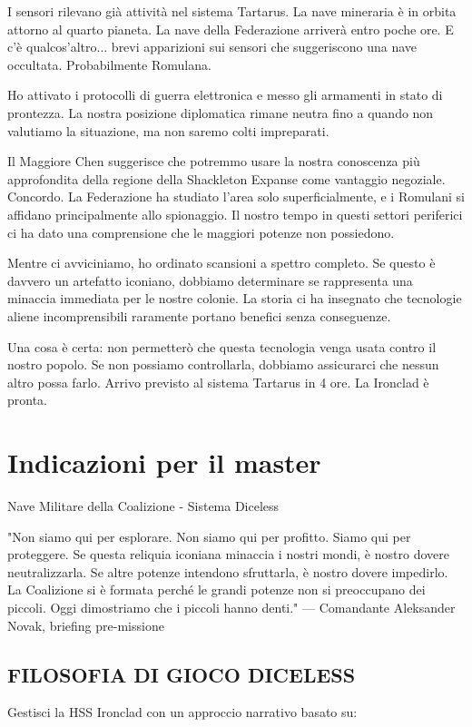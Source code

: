 \documentclass[letterpaper,twocolumn,openany,nodeprecatedcode]{dndbook}
\begin{document}
\begin{DndReadAloud}
I sensori rilevano già attività nel sistema Tartarus. La nave mineraria è in orbita attorno al quarto pianeta. La nave della Federazione arriverà entro poche ore. E c'è qualcos'altro... brevi apparizioni sui sensori che suggeriscono una nave occultata. Probabilmente Romulana.

Ho attivato i protocolli di guerra elettronica e messo gli armamenti in stato di prontezza. La nostra posizione diplomatica rimane neutra fino a quando non valutiamo la situazione, ma non saremo colti impreparati.

Il Maggiore Chen suggerisce che potremmo usare la nostra conoscenza più approfondita della regione della Shackleton Expanse come vantaggio negoziale. Concordo. La Federazione ha studiato l'area solo superficialmente, e i Romulani si affidano principalmente allo spionaggio. Il nostro tempo in questi settori periferici ci ha dato una comprensione che le maggiori potenze non possiedono.

Mentre ci avviciniamo, ho ordinato scansioni a spettro completo. Se questo è davvero un artefatto iconiano, dobbiamo determinare se rappresenta una minaccia immediata per le nostre colonie. La storia ci ha insegnato che tecnologie aliene incomprensibili raramente portano benefici senza conseguenze.

Una cosa è certa: non permetterò che questa tecnologia venga usata contro il nostro popolo. Se non possiamo controllarla, dobbiamo assicurarci che nessun altro possa farlo.
Arrivo previsto al sistema Tartarus in 4 ore. La Ironclad è pronta.

\end{DndReadAloud}
\section {Indicazioni per il master}

Nave Militare della Coalizione - Sistema Diceless

"Non siamo qui per esplorare. Non siamo qui per profitto. Siamo qui per proteggere. Se questa reliquia iconiana minaccia i nostri mondi, è nostro dovere neutralizzarla. Se altre potenze intendono sfruttarla, è nostro dovere impedirlo. La Coalizione si è formata perché le grandi potenze non si preoccupano dei piccoli. Oggi dimostriamo che i piccoli hanno denti."
— Comandante Aleksander Novak, briefing pre-missione

\subsection{FILOSOFIA DI GIOCO DICELESS}
Gestisci la HSS Ironclad con un approccio narrativo basato su:
\end{document}
